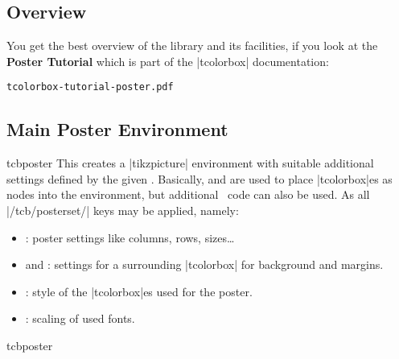 \subsection{Overview}\label{subsec:poster_overview}


\begin{tcolorbox}[base example,hyperurl={tcolorbox-tutorial-poster.pdf},title=Click me to see the tutorial]
You get the best overview of the  library and its facilities,
if you look at the \textbf{Poster Tutorial} which is part of the |tcolorbox|
documentation:\par
\texttt{tcolorbox-tutorial-poster.pdf}
\end{tcolorbox}



\clearpage
\subsection{Main Poster Environment}\label{subsec:poster_environment}

\begin{docEnvironment}[doc new=2017-07-03]{tcbposter}{}
  This creates a |tikzpicture| environment with suitable additional
  settings defined by the given .
  Basically,  and  are
  used to place |tcolorbox|es as nodes into the environment,
  but additional \tikzname\ code can also be used.
  As  all |/tcb/posterset/| keys may be applied, namely:
\begin{itemize}
\item{}: poster settings like columns, rows, sizes\ldots
\item{} and :
  settings for a surrounding |tcolorbox| for background and margins.
\item{}: style of the |tcolorbox|es used for the poster.
\item{}: scaling of used fonts.
\end{itemize}

\begin{exdispExample}{tcbposter}
  \begin{tcbposter}[
    poster = {showframe,height=10cm,spacing=2mm},
    boxes  = {beamer,colframe=blue!50!black,colback=blue!50,colupper=yellow!50},
  ]
  \end{tcbposter}
\end{exdispExample}
\end{docEnvironment}

